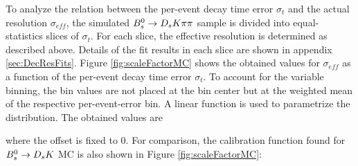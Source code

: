 To analyze the relation between the per-event decay time error $\sigma_t$ and the actual resolution $\sigma_{eff}$, 
the simulated ${{B}^0_{s}}\rightarrow{\ensuremath{{D}_{s}}}{\ensuremath{K}}{\ensuremath{\pi}}{\ensuremath{\pi}}$ sample is divided into equal-statistics slices of $\sigma_t$. 
For each slice, the effective resolution is determined as described above.
Details of the fit results in each slice are shown in appendix \ref{sec:DecResFits}. 
%
%
%
Figure \ref{fig:scaleFactorMC} shows the obtained values for $\sigma_{eff}$ as a function of the per-event decay time error $\sigma_{t}$. 
To account for the variable binning, the bin values are not placed at the bin center but at the weighted mean of the respective per-event-error bin.
A linear function 
is used to parametrize the distribution. 
The obtained values are 

where 
the offset is fixed to 0.
For comparison, the calibration function found for ${{B}^0_{s}}\rightarrow{\ensuremath{{D}_{s}}}{\ensuremath{K}}$ MC is also shown in Figure \ref{fig:scaleFactorMC}\cite{Aaij:2017lff}: 

